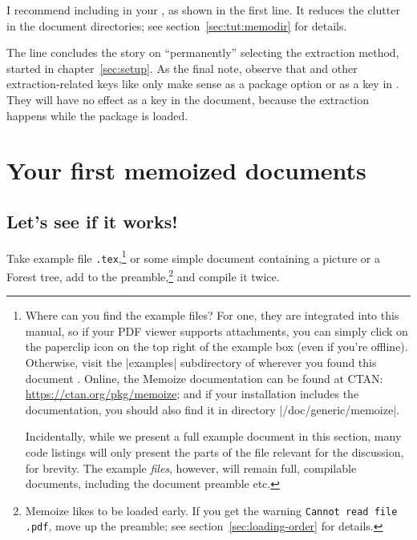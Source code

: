 \documentclass[a4paper,11pt]{article}
\begin{document}

I recommend including  in your ,
as shown in the first line.  It reduces the clutter in the document
directories; see section~\ref{sec:tut:memodir} for details.

The  line concludes the story on ``permanently'' selecting the
extraction method, started in chapter~\ref{sec:setup}.  As the final note,
observe that  and other extraction-related keys like
 only make sense as a package option or as a
 key in .  They will have no effect as a
 key in the document, because the extraction happens while the
package is loaded.



\section{Your first memoized documents}
\label{sec:tut}

\subsection{Let's see if it works!}
\label{sec:tut:test}

%

Take example file \texttt{\examplename.tex},\footnote{Where can you find
  the example files?  For one, they are integrated into this manual, so if your
  PDF viewer supports attachments, you can simply click on the paperclip icon
  on the top right of the example box (even if you're offline).  Otherwise,
  visit the |examples| subdirectory of wherever you found this document
  \Smiley.  Online, the Memoize documentation can be found at CTAN:
  \url{https://ctan.org/pkg/memoize}; and if your  installation
  includes the documentation, you should also find it in directory |/doc/generic/memoize|.
  
  Incidentally, while we present a full example document in this section, many
  code listings will only present the parts of the file relevant for the
  discussion, for brevity.  The example \emph{files}, however, will remain
  full, compilable documents, including the document preamble etc.} or some
simple document containing a \TikZ picture or a Forest tree, add
\EmphVerbatim{\usepackage{memoize}} to the preamble,\footnote{Memoize likes to
  be loaded early.  If you get the warning \texttt{Cannot read file
    .pdf}, move  up the
  preamble; see section~\ref{sec:loading-order} for details.} and compile it
twice.
\end{document}
